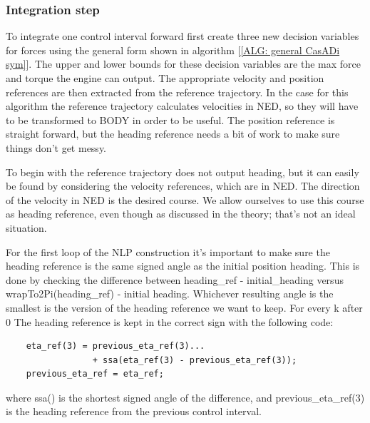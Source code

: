 
\subsubsection*{Integration step} \label{CHAP: integration step}
To integrate one control interval forward first create three new decision variables for forces using the general form
shown in algorithm [\ref{ALG: general CasADi sym}]. The upper and lower bounds for these decision variables are the max force and torque
the engine can output. The appropriate velocity and position references are then extracted from the reference trajectory. In the case
for this algorithm the reference trajectory calculates velocities in NED, so they will have to be transformed to BODY in order to be useful.
The position reference is straight forward, but the heading reference needs a bit of work to make sure things don't get messy.

To begin with the reference trajectory does not output heading, but it can easily be found by considering the velocity references, which are in NED.
The direction of the velocity in NED is the desired course. We allow ourselves to use this course as heading reference, even though as discussed in the theory;
that's not an ideal situation.

For the first loop of the \gls{NLP} construction it's important to make sure the heading reference is the same signed angle as the initial position heading.
This is done by checking the difference between heading\_ref - initial\_heading versus wrapTo2Pi(heading\_ref) - initial heading. Whichever resulting angle is the smallest
is the version of the heading reference we want to keep. For every k after 0 The heading reference is kept in the correct sign with the following code:
\begin{lstlisting}
    eta_ref(3) = previous_eta_ref(3)...
                 + ssa(eta_ref(3) - previous_eta_ref(3));
    previous_eta_ref = eta_ref; 
\end{lstlisting}
where ssa() is the shortest signed angle of the difference, and previous\_eta\_ref(3) is the heading reference from the previous control interval.

